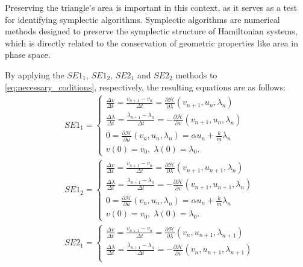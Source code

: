 \documentclass[a4paper, 10pt]{article}
\newcommand{\SEoo}{SE1_1}
\newcommand{\SEot}{SE1_2}
\newcommand{\SEto}{SE2_1}
\newcommand{\SEtt}{SE2_2}
\begin{document}
Preserving the triangle's area is important in this context, as it serves as a test for identifying symplectic algorithms. Symplectic algorithms are numerical methods designed to preserve the symplectic structure of Hamiltonian systems, which is directly related to the conservation of geometric properties like area in phase space.

By applying the $\SEoo$, $\SEot$, $\SEto$ and $\SEtt$ methods to \eqref{eq:necessary_coditions}, respectively, the resulting equations are as follows:
\begin{equation}
    \begin{aligned}
       & \SEoo = \begin{cases}
          \frac{\Delta v}{\Delta t} = \frac{v_{n+1} - v_{n}}{\Delta t}= \frac{\partial \mathcal{H}}{\partial \lambda} (v_{n+1},u_{n},\lambda_{n}) \\
          \frac{\Delta \lambda}{\Delta t} =\frac{\lambda_{n+1} - \lambda_{n}}{\Delta t} =  - \frac{\partial \mathcal{H}}{\partial v}  (v_{n+1},u_{n},\lambda_{n}) \\
          0 =  \frac{\partial \mathcal{H}}{\partial u} (v_n,u_n,\lambda_n) = \alpha u_n + \frac{k}{m}\lambda_n \\
          v(0) = v_0,\; \lambda(0) = \lambda_0.
       \end{cases} \\
       & \SEot =  \begin{cases}
            \frac{\Delta v}{\Delta t} = \frac{v_{n+1} - v_{n}}{\Delta t}= \frac{\partial \mathcal{H}}{\partial \lambda} (v_{n+1},u_{n+1},\lambda_{n}) \\
            \frac{\Delta \lambda}{\Delta t} =\frac{\lambda_{n+1} - \lambda_{n}}{\Delta t} =  - \frac{\partial \mathcal{H}}{\partial v} (v_{n+1},u_{n+1},\lambda_{n})  \\
            0 =  \frac{\partial \mathcal{H}}{\partial u} (v_n,u_n,\lambda_n) = \alpha u_n + \frac{k}{m}\lambda_n \\
            v(0) = v_0,\; \lambda(0) = \lambda_0.
       \end{cases} \\
       & \SEto = \begin{cases}
          \frac{\Delta v}{\Delta t} = \frac{v_{n+1} - v_{n}}{\Delta t}= \frac{\partial \mathcal{H}}{\partial \lambda} (v_{n},u_{n+1},\lambda_{n+1}) \\
          \frac{\Delta \lambda}{\Delta t} =\frac{\lambda_{n+1} - \lambda_{n}}{\Delta t} =  - \frac{\partial \mathcal{H}}{\partial v} (v_{n},u_{n+1},\lambda_{n+1}) \\

\end{cases}
\end{aligned}
\end{equation}
\end{document}
